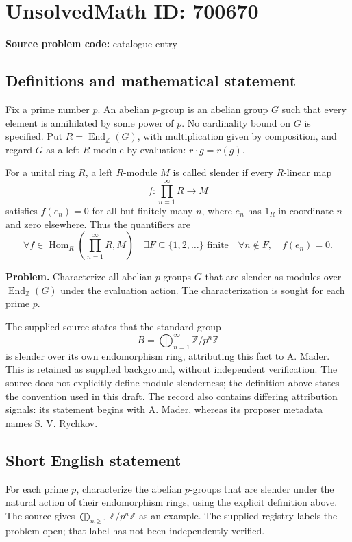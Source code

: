 \documentclass[11pt]{article}
\begin{document}
\section*{UnsolvedMath ID: 700670}
\textbf{Source problem code:} catalogue entry
\subsection{Definitions and mathematical statement}
Fix a prime number \(p\). An abelian \(p\)-group is an abelian group \(G\) such that every element is annihilated by some power of \(p\). No cardinality bound on \(G\) is specified. Put \(R=\operatorname{End}_{\mathbb Z}(G)\), with multiplication given by composition, and regard \(G\) as a left \(R\)-module by evaluation: \(r\cdot g=r(g)\).

For a unital ring \(R\), a left \(R\)-module \(M\) is called slender if every \(R\)-linear map
\[
 f:\prod_{n=1}^{\infty}R\longrightarrow M
\]
satisfies \(f(e_n)=0\) for all but finitely many \(n\), where \(e_n\) has \(1_R\) in coordinate \(n\) and zero elsewhere. Thus the quantifiers are
\[
 \forall f\in\operatorname{Hom}_R\!\left(\prod_{n=1}^{\infty}R,M\right)\quad
 \exists F\subseteq\{1,2,\ldots\}\text{ finite}\quad
 \forall n\notin F,\quad f(e_n)=0.
\]

\textbf{Problem.} Characterize all abelian \(p\)-groups \(G\) that are slender as modules over \(\operatorname{End}_{\mathbb Z}(G)\) under the evaluation action. The characterization is sought for each prime \(p\).

The supplied source states that the standard group
\[
 B=\bigoplus_{n=1}^{\infty}\mathbb Z/p^n\mathbb Z
\]
is slender over its own endomorphism ring, attributing this fact to A. Mader. This is retained as supplied background, without independent verification. The source does not explicitly define module slenderness; the definition above states the convention used in this draft. The record also contains differing attribution signals: its statement begins with A. Mader, whereas its proposer metadata names S. V. Rychkov.
\subsection{Short English statement}
For each prime \(p\), characterize the abelian \(p\)-groups that are slender under the natural action of their endomorphism rings, using the explicit definition above. The source gives \(\bigoplus_{n\geq1}\mathbb Z/p^n\mathbb Z\) as an example. The supplied registry labels the problem open; that label has not been independently verified.
\end{document}
